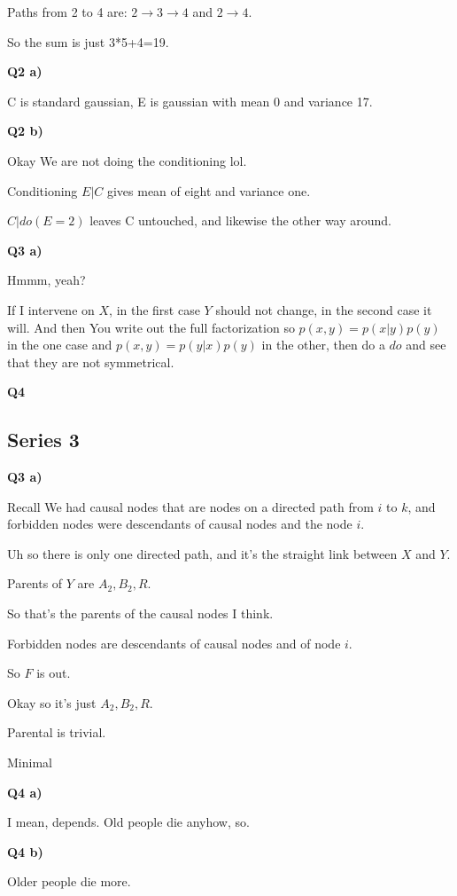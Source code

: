 \documentclass{article}
\begin{document}
			Paths from 2 to 4 are: $2\to3\to4$ and $2\to 4$. 
			
			So the sum is just 3*5+4=19.
			
		\textbf{Q2 a)}
		
			C is standard gaussian, E is gaussian with mean 0 and variance 17.
			
		\textbf{Q2 b)}
		
			Okay We are not doing the conditioning lol.
			
			Conditioning $E|C$ gives mean of eight and variance one.
			
			$C|do(E=2)$ leaves C untouched, and likewise the other way around.
			
			
		\textbf{Q3 a)}
		
			Hmmm, yeah?
			
			If I intervene on $X$, in the first case $Y$ should not change, in the second case it will. And then You write out the full factorization so $p(x, y) = p(x|y)p(y)$ in the one case and $p(x, y) = p(y|x)p(y)$ in the other, then do a $do$ and see that they are not symmetrical.
			
		\textbf{Q4}
		
	\subsection{Series 3}
	
		\textbf{Q3 a)}
		
			Recall We had causal nodes that are nodes on a directed path from $i$ to $k$, and forbidden nodes were descendants of causal nodes and the node $i$.
			
			Uh so there is only one directed path, and it's the straight link between $X$ and $Y$.
			
			Parents of $Y$ are $A_2, B_2, R$.
			
			So that's the parents of the causal nodes I think.
			
			Forbidden nodes are descendants of causal nodes and of node $i$.
			
			So $F$ is out.
			
			Okay so it's just $A_2, B_2, R$.
			
			Parental is trivial.
			
			Minimal
			
		\textbf{Q4 a)}
	
			I mean, depends. Old people die anyhow, so.
			
		\textbf{Q4 b)}
		
			Older people die more. 
			
\end{document}
